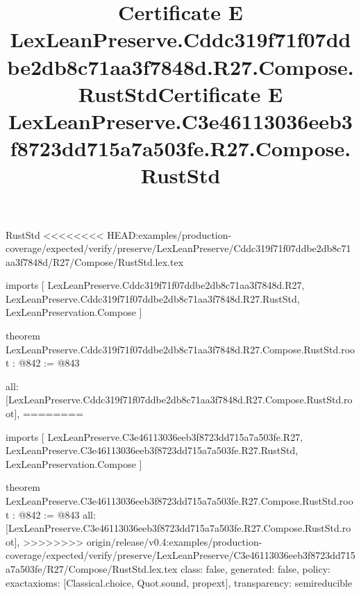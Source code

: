 \begin{lexlean}{RustStd}
<<<<<<<< HEAD:examples/production-coverage/expected/verify/preserve/LexLeanPreserve/Cddc319f71f07ddbe2db8c71aa3f7848d/R27/Compose/RustStd.lex.tex
\title{Certificate E LexLeanPreserve.Cddc319f71f07ddbe2db8c71aa3f7848d.R27.Compose.RustStd}
\begin{coremodule}
imports [
  LexLeanPreserve.Cddc319f71f07ddbe2db8c71aa3f7848d.R27,
  LexLeanPreserve.Cddc319f71f07ddbe2db8c71aa3f7848d.R27.RustStd,
  LexLeanPreservation.Compose
]

theorem LexLeanPreserve.Cddc319f71f07ddbe2db8c71aa3f7848d.R27.Compose.RustStd.root : @842 := @843 {
  all: [LexLeanPreserve.Cddc319f71f07ddbe2db8c71aa3f7848d.R27.Compose.RustStd.root],
========
\title{Certificate E LexLeanPreserve.C3e46113036eeb3f8723dd715a7a503fe.R27.Compose.RustStd}
\begin{coremodule}
imports [
  LexLeanPreserve.C3e46113036eeb3f8723dd715a7a503fe.R27,
  LexLeanPreserve.C3e46113036eeb3f8723dd715a7a503fe.R27.RustStd,
  LexLeanPreservation.Compose
]

theorem LexLeanPreserve.C3e46113036eeb3f8723dd715a7a503fe.R27.Compose.RustStd.root : @842 := @843 {
  all: [LexLeanPreserve.C3e46113036eeb3f8723dd715a7a503fe.R27.Compose.RustStd.root],
>>>>>>>> origin/release/v0.4:examples/production-coverage/expected/verify/preserve/LexLeanPreserve/C3e46113036eeb3f8723dd715a7a503fe/R27/Compose/RustStd.lex.tex
  class: false,
  generated: false,
  policy: exact{axioms: [Classical.choice, Quot.sound, propext]},
  transparency: semireducible
}


\end{coremodule}}
\end{coremodule}
\end{lexlean}
